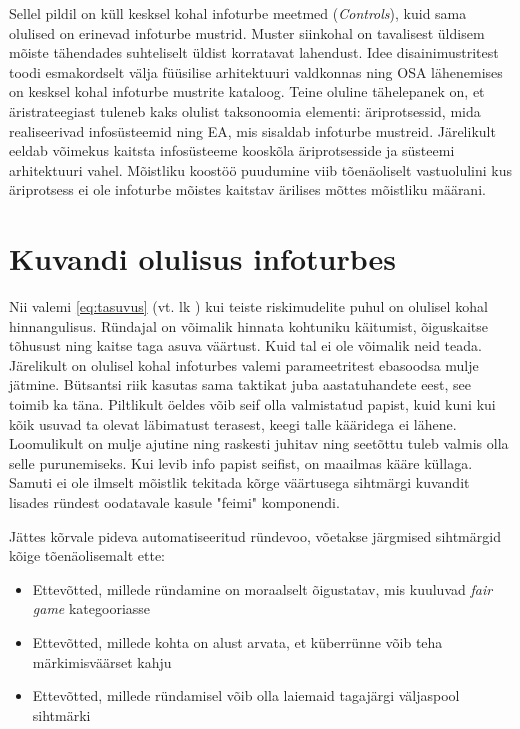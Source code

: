 \documentclass{tufte-book}
\begin{document}
Sellel pildil on küll kesksel kohal infoturbe meetmed (\emph{Controls}), kuid sama olulised on erinevad infoturbe mustrid. Muster siinkohal on tavalisest üldisem mõiste tähendades suhteliselt üldist korratavat lahendust. Idee disainimustritest toodi esmakordselt välja füüsilise arhitektuuri valdkonnas ning OSA lähenemises on kesksel kohal infoturbe mustrite kataloog. Teine oluline tähelepanek on, et äristrateegiast tuleneb kaks olulist taksonoomia elementi: äriprotsessid, mida realiseerivad infosüsteemid ning EA, mis sisaldab infoturbe mustreid. Järelikult eeldab võimekus kaitsta infosüsteeme kooskõla äriprotsesside ja süsteemi arhitektuuri vahel. Mõistliku koostöö puudumine viib tõenäoliselt vastuolulini kus äriprotsess ei ole infoturbe mõistes kaitstav ärilises mõttes mõistliku määrani.

\section{Kuvandi olulisus infoturbes}
Nii valemi \ref{eq:tasuvus} (vt. lk \pageref{eq:tasuvus}) kui teiste riskimudelite puhul on olulisel kohal hinnangulisus. Ründajal on võimalik hinnata kohtuniku käitumist, õiguskaitse tõhusust ning kaitse taga asuva väärtust. Kuid tal ei ole võimalik neid teada. Järelikult on olulisel kohal infoturbes valemi parameetritest ebasoodsa mulje jätmine. Bütsantsi riik kasutas sama taktikat juba aastatuhandete eest, see toimib ka täna. Piltlikult öeldes võib seif olla valmistatud papist, kuid kuni kui kõik usuvad ta olevat läbimatust terasest, keegi talle kääridega ei lähene. Loomulikult on mulje ajutine ning raskesti juhitav ning seetõttu tuleb valmis olla selle purunemiseks. Kui levib info papist seifist, on maailmas kääre küllaga. Samuti ei ole ilmselt mõistlik tekitada kõrge väärtusega sihtmärgi kuvandit lisades ründest oodatavale kasule "feimi" komponendi. 

Jättes kõrvale pideva automatiseeritud ründevoo, võetakse järgmised sihtmärgid kõige tõenäolisemalt ette:
\begin{itemize}
	\item Ettevõtted, millede ründamine on moraalselt õigustatav, mis kuuluvad \emph{fair game} kategooriasse
	\item Ettevõtted, millede kohta on alust arvata, et küberrünne võib teha märkimisväärset kahju
	\item Ettevõtted, millede ründamisel võib olla laiemaid tagajärgi väljaspool sihtmärki
\end{itemize}
\end{document}

